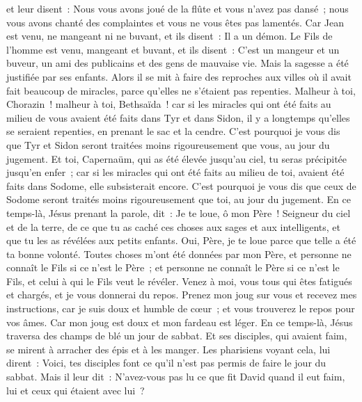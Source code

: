 \begin{multicols}{2}
et leur disent~: Nous vous avons joué de la flûte et vous n'avez pas dansé~; nous vous avons chanté des complaintes et vous ne vous êtes pas lamentés.
Car Jean est venu, ne mangeant ni ne buvant, et ils disent~: Il a un démon.
Le Fils de l'homme est venu, mangeant et buvant, et ils disent~: C'est un mangeur et un buveur, un ami des publicains et des gens de mauvaise vie. Mais la sagesse a été justifiée par ses enfants.
Alors il se mit à faire des reproches aux villes où il avait fait beaucoup de miracles, parce qu'elles ne s'étaient pas repenties.
Malheur à toi, Chorazin~! malheur à toi, Bethsaïda~! car si les miracles qui ont été faits au milieu de vous avaient été faits dans Tyr et dans Sidon, il y a longtemps qu'elles se seraient repenties, en prenant le sac et la cendre.
C'est pourquoi je vous dis que Tyr et Sidon seront traitées moins rigoureusement que vous, au jour du jugement.
Et toi, Capernaüm, qui as été élevée jusqu'au ciel, tu seras précipitée jusqu'en enfer~; car si les miracles qui ont été faits au milieu de toi, avaient été faits dans Sodome, elle subsisterait encore.
C'est pourquoi je vous dis que ceux de Sodome seront traités moins rigoureusement que toi, au jour du jugement.
En ce temps-là, Jésus prenant la parole, dit~: Je te loue, ô mon Père~! Seigneur du ciel et de la terre, de ce que tu as caché ces choses aux sages et aux intelligents, et que tu les as révélées aux petits enfants.
Oui, Père, je te loue parce que telle a été ta bonne volonté.
Toutes choses m'ont été données par mon Père, et personne ne connaît le Fils si ce n'est le Père~; et personne ne connaît le Père si ce n'est le Fils, et celui à qui le Fils veut le révéler.
Venez à moi, vous tous qui êtes fatigués et chargés, et je vous donnerai du repos.
Prenez mon joug sur vous et recevez mes instructions, car je suis doux et humble de cœur~; et vous trouverez le repos pour vos âmes.
Car mon joug est doux et mon fardeau est léger.
\VerseOne{}En ce temps-là, Jésus traversa des champs de blé un jour de sabbat. Et ses disciples, qui avaient faim, se mirent à arracher des épis et à les manger.
Les pharisiens voyant cela, lui dirent~: Voici, tes disciples font ce qu'il n'est pas permis de faire le jour du sabbat.
Mais il leur dit~: N'avez-vous pas lu ce que fit David quand il eut faim, lui et ceux qui étaient avec lui~?

\end{multicols}

